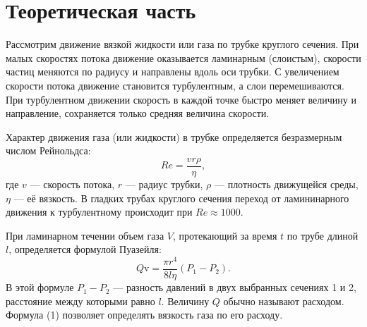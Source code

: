 \documentclass[a4paper, fontsize=14pt]{article}
\begin{document}
\section*{Теоретическая часть}
Рассмотрим движение вязкой жидкости или газа по трубке круглого сечения. При малых скоростях потока движение оказывается ламинарным (слоистым), скорости частиц меняются по радиусу и направлены вдоль оси трубки. С увеличением скорости потока движение становится турбулентным, а слои перемешиваются. При турбулентном движении скорость в каждой точке быстро меняет величину и направление, сохраняется только средняя величина скорости.

Характер движения газа (или жидкости) в трубке определяется безразмерным числом Рейнольдса:
\[
	Re = \frac{vr\rho}{\eta},
\]
где $v$ --- скорость потока, $r$ --- радиус трубки, $\rho$ --- плотность движущейся среды, $\eta$ --- её вязкость. В гладких трубах круглого сечения переход от ламининарного движения к турбулентному происходит при $Re \approx 1000$.

При ламинарном течении объем газа $V$, протекающий за время $t$ по трубе длиной $l$, определяется формулой Пуазейля:
\begin{equation}
	Q\text{v} = \frac{\pi r^4}{8 l \eta}(P_1 - P_2).
\end{equation}
В этой формуле $P_1 - P_2$ --- разность давлений в двух выбранных сечениях 1 и 2, расстояние между которыми равно $l$. Величину $Q$ обычно называют расходом. Формула (1) позволяет определять вязкость газа по его расходу.
\end{document}
